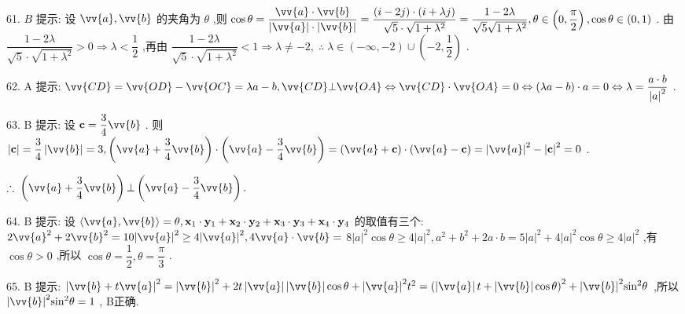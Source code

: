 61. $B$ 提示: 设 $\vv{a},\vv{b}$ 的夹角为 $\theta$ ,则 $\cos \theta  = \dfrac{\vv{a} \cdot  \vv{b}}{\left| \vv{a}\right|  \cdot  \left| \vv{b}\right| } = \dfrac{\left( {i - {2j}}\right)  \cdot  \left( {i + {\lambda j}}\right) }{\sqrt{5} \cdot  \sqrt{1 + {\lambda }^{2}}} = \dfrac{1 - {2\lambda }}{\sqrt{5}\sqrt{1 + {\lambda }^{2}}},\mathbf{\theta } \in  \left( {0,\dfrac{\pi }{2}}\right) ,\cos \theta  \in  \left( {0,1}\right)$ . 由 $\dfrac{1 - {2\lambda }}{\sqrt{5} \cdot  \sqrt{1 + {\lambda }^{2}}} > 0 \Rightarrow  \lambda  < \dfrac{1}{2}$ ,再由 $\dfrac{1 - {2\lambda }}{\sqrt{5} \cdot  \sqrt{1 + {\lambda }^{2}}} < 1 \Rightarrow  \lambda  \neq   - 2,\;\therefore \;\lambda  \in  \left( {-\infty , - 2}\right)  \cup  \left( {-2,\dfrac{1}{2}}\right)$ .

62. A 提示: $\vv{CD} = \vv{OD} - \vv{OC} = {\lambda a} - b,\vv{CD}\bot \vv{OA} \Leftrightarrow  \vv{CD} \cdot  \vv{OA} = 0 \Leftrightarrow  \left( {{\lambda a} - b}\right)  \cdot  a = 0 \Leftrightarrow  \lambda  = \dfrac{a \cdot  b}{{\left| a\right| }^{2}}$ .

63. B 提示: 设 $\mathbf{c} = \dfrac{3}{4}\vv{b}$ . 则 $\left| \mathbf{c}\right|  = \dfrac{3}{4}\left| \vv{b}\right|  = 3,\left( {\vv{a} + \dfrac{3}{4}\vv{b}}\right)  \cdot  \left( {\vv{a} - \dfrac{3}{4}\vv{b}}\right)  = \left( {\vv{a} + \mathbf{c}}\right)  \cdot  \left( {\vv{a} - \mathbf{c}}\right)  = {\left| \vv{a}\right| }^{2} - {\left| \mathbf{c}\right| }^{2} = 0$ .

$\therefore \;\left( {\vv{a} + \dfrac{3}{4}\vv{b}}\right)  \bot  \left( {\vv{a} - \dfrac{3}{4}\vv{b}}\right) .$

64. B 提示: 设 $\langle \vv{a},\vv{b}\rangle  = \theta ,{\mathbf{x}}_{1} \cdot  {\mathbf{y}}_{1} + {\mathbf{x}}_{2} \cdot  {\mathbf{y}}_{2} + {\mathbf{x}}_{3} \cdot  {\mathbf{y}}_{3} + {\mathbf{x}}_{4} \cdot  {\mathbf{y}}_{4}$ 的取值有三个: $2{\vv{a}}^{2} + 2{\vv{b}}^{2} = {10}{\left| \vv{a}\right| }^{2} \geq  4{\left| \vv{a}\right| }^{2},4\vv{a} \cdot  \vv{b} =$  $8{\left| a\right| }^{2}\cos \theta  \geq  4{\left| a\right| }^{2},{a}^{2} + {b}^{2} + {2a} \cdot  b = 5{\left| a\right| }^{2} + 4{\left| a\right| }^{2}\cos \theta  \geq  4{\left| a\right| }^{2}$ ,有 $\cos \theta  > 0$ ,所以 $\cos \theta  = \dfrac{1}{2},\theta  = \dfrac{\pi }{3}$ .

65. B 提示: ${\left| \vv{b} + t\vv{a}\right| }^{2} = {\left| \vv{b}\right| }^{2} + {2t}\left| \vv{a}\right| \left| \vv{b}\right| \cos \theta  + {\left| \vv{a}\right| }^{2}{t}^{2} = {\left( \left| \vv{a}\right| t + \left| \vv{b}\right| \cos \theta \right) }^{2} + {\left| \vv{b}\right| }^{2}{\sin }^{2}\theta$ ,所以 ${\left| \vv{b}\right| }^{2}{\sin }^{2}\theta  = 1$ , B正确.

